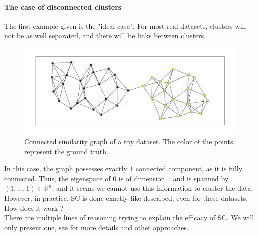 \documentclass[a4paper,12pt]{article}
\theoremstyle{definition}
\theoremstyle{plain}
\def\R{\mathbb{R}}%
\begin{document}
\paragraph{The case of disconnected clusters} 
The first example given is the "ideal case". For most real datasets, clusters will not be as well separated, and there will be links between clusters. 
\begin{figure}[H]
	\centering
	\includegraphics[width=0.6\linewidth]{figures/connected_example}
	\caption{Connected similarity graph of a toy dataset. The color of the points represent the ground truth. }
	\label{fig:connected_example}
\end{figure}
In this case, the graph possesses exactly $1$ connected component, as it is fully connected. Thus, the eigenspace of $0$ is of dimension $1$ and is spanned by $(1,\ldots,1) \in \R^n$, and it seems we cannot use this information to cluster the data.
However, in practice, SC is done exactly like described, even for these datasets. How does it work ? \\
There are multiple lines of reasoning trying to explain the efficacy of SC. We will only present one, see \cite{tutorial} for more details and other approaches.
\end{document}
